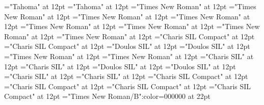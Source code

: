 \documentclass[a4paper]{article}
\begin{document}
\font\spanggofonipaxemic="Tahoma" at 12pt
\font\divggofonipaxemic="Tahoma" at 12pt
\font\spanfr="Times New Roman" at 12pt
\font\divfr="Times New Roman" at 12pt
\font\spanfa="Times New Roman" at 12pt
\font\divfa="Times New Roman" at 12pt
\font\spanes="Times New Roman" at 12pt
\font\dives="Times New Roman" at 12pt
\font\spanen="Times New Roman" at 12pt
\font\diven="Times New Roman" at 12pt
\font\spanenQaaaxtest="Charis SIL Compact" at 12pt
\font\divenQaaaxtest="Charis SIL Compact" at 12pt
\font\spanenfonipa="Doulos SIL" at 12pt
\font\divenfonipa="Doulos SIL" at 12pt
\font\spande="Times New Roman" at 12pt
\font\divde="Times New Roman" at 12pt
\font\spanbzh="Charis SIL" at 12pt
\font\divbzh="Charis SIL" at 12pt
\font\spanbzhfonipa="Doulos SIL" at 12pt
\font\divbzhfonipa="Doulos SIL" at 12pt
\font\spanbss="Charis SIL" at 12pt
\font\divbss="Charis SIL" at 12pt
\font\spanbssxako="Charis SIL Compact" at 12pt
\font\divbssxako="Charis SIL Compact" at 12pt
\font\spanbssfonipa="Charis SIL Compact" at 12pt
\font\divbssfonipa="Charis SIL Compact" at 12pt
\color{black} 
\thispagestyle{empty} 
\font\CoverPageHeading="Times New Roman/B":color=000000 at 22pt 
\vskip 60pt 
\begin{center} 
\end{center} 
\newpage 
\newpage 
\thispagestyle{empty} 
\mbox{} 
\end{document}
